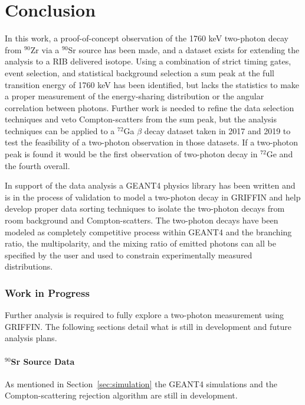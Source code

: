 \documentclass[cnatzke_thesis_proposal.tex]{subfiles}
\begin{document}
\chapter{Conclusion}

In this work, a proof-of-concept observation of the 1760 keV two-photon decay from $^{90}$Zr via a $^{90}$Sr source has been made, and a dataset exists for extending the analysis to a RIB delivered isotope. 
Using a combination of strict timing gates, event selection, and statistical background selection a sum peak at the full transition energy of 1760 keV has been identified, but lacks the statistics to make a proper measurement of the energy-sharing distribution or the angular correlation between photons.
Further work is needed to refine the data selection techniques and veto Compton-scatters from the sum peak, but the analysis techniques can be applied to a $^{72}$Ga $\beta$ decay dataset taken in 2017 and 2019 to test the feasibility of a two-photon observation in those datasets. 
If a two-photon peak is found it would be the first observation of two-photon decay in $^{72}$Ge and the fourth overall. 

In support of the data analysis a GEANT4 physics library has been written and is in the process of validation to model a two-photon decay in GRIFFIN and help develop proper data sorting techniques to isolate the two-photon decays from room background and Compton-scatters. 
The two-photon decays have been modeled as completely competitive process within GEANT4 and the branching ratio, the multipolarity, and the mixing ratio of emitted photons can all be specified by the user and used to constrain experimentally measured distributions. 



\subsection{Work in Progress}
Further analysis is required to fully explore a two-photon measurement using GRIFFIN. 
The following sections detail what is still in development and future analysis plans. 

\subsubsection{$^{90}$Sr Source Data}
As mentioned in Section~\ref{sec:simulation} the GEANT4 simulations and the Compton-scattering rejection algorithm are still in development. 
\end{document}
